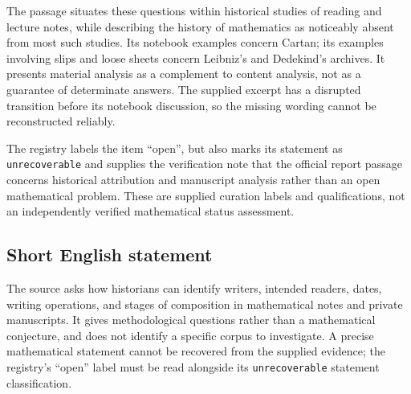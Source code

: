 \documentclass[11pt]{article}
\begin{document}
The passage situates these questions within historical studies of reading and lecture notes, while describing the history of mathematics as noticeably absent from most such studies. Its notebook examples concern Cartan; its examples involving slips and loose sheets concern Leibniz's and Dedekind's archives. It presents material analysis as a complement to content analysis, not as a guarantee of determinate answers. The supplied excerpt has a disrupted transition before its notebook discussion, so the missing wording cannot be reconstructed reliably.

The registry labels the item ``open'', but also marks its statement as \texttt{unrecoverable} and supplies the verification note that the official report passage concerns historical attribution and manuscript analysis rather than an open mathematical problem. These are supplied curation labels and qualifications, not an independently verified mathematical status assessment.
\subsection{Short English statement}
The source asks how historians can identify writers, intended readers, dates, writing operations, and stages of composition in mathematical notes and private manuscripts. It gives methodological questions rather than a mathematical conjecture, and does not identify a specific corpus to investigate. A precise mathematical statement cannot be recovered from the supplied evidence; the registry's ``open'' label must be read alongside its \texttt{unrecoverable} statement classification.
\end{document}
